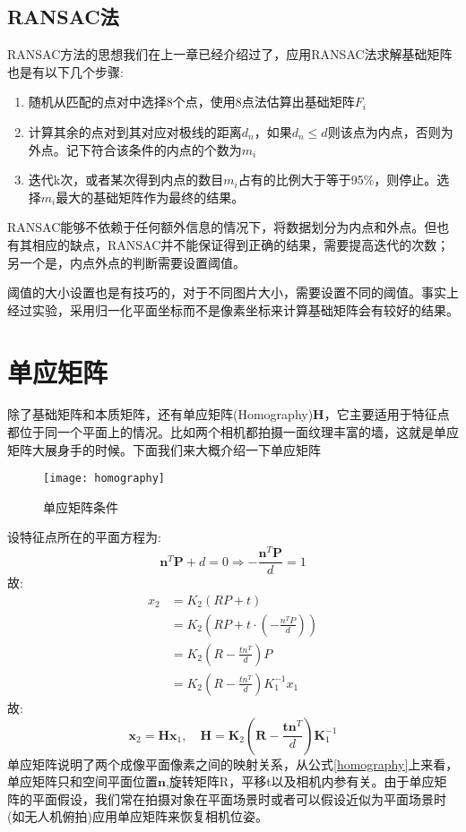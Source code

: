 \subsection{RANSAC法}
RANSAC方法的思想我们在上一章已经介绍过了，应用RANSAC法求解基础矩阵也是有以下几个步骤:
\begin{enumerate}
	\item 随机从匹配的点对中选择8个点，使用8点法估算出基础矩阵$F_i$
	\item 计算其余的点对到其对应对极线的距离$d_n$，如果$d_n≤d$则该点为内点，否则为外点。记下符合该条件的内点的个数为$m_i$
	\item 迭代k次，或者某次得到内点的数目$m_i$占有的比例大于等于95\%，则停止。选择$m_i$最大的基础矩阵作为最终的结果。
\end{enumerate}\par
RANSAC能够不依赖于任何额外信息的情况下，将数据划分为内点和外点。但也有其相应的缺点，RANSAC并不能保证得到正确的结果，需要提高迭代的次数；另一个是，内点外点的判断需要设置阈值。\par
阈值的大小设置也是有技巧的，对于不同图片大小，需要设置不同的阈值。事实上经过实验，采用归一化平面坐标而不是像素坐标来计算基础矩阵会有较好的结果。
\section{单应矩阵}
除了基础矩阵和本质矩阵，还有单应矩阵(Homography)$\boldsymbol{H}$，它主要适用于特征点都位于同一个平面上的情况。比如两个相机都拍摄一面纹理丰富的墙，这就是单应矩阵大展身手的时候。下面我们来大概介绍一下单应矩阵\par
\begin{figure}[H]
	\centering
	\texttt{[image: homography]}
	\caption{单应矩阵条件}
\end{figure}
设特征点所在的平面方程为:
\begin{equation}
	\boldsymbol{n}^{T} \boldsymbol{P}+d=0 \Rightarrow -\frac{\boldsymbol{n}^{T} \boldsymbol{P}}{d}=1
\end{equation}
故:
\begin{equation}
\begin{aligned} x_{2} &=K_{2}(R P+t) \\ &=K_{2}\left(R P+t \cdot\left(-\frac{n^{T} P}{d}\right)\right) \\ &=K_{2}\left(R-\frac{t n^{T}}{d}\right) P \\ &=K_{2}\left(R-\frac{t n^{T}}{d}\right) K_{1}^{-1} x_{1} \end{aligned}
\end{equation}
故:
\begin{equation}
\boldsymbol{x}_{2}=\boldsymbol{H x}_{1}, \quad \boldsymbol{H}=\boldsymbol{K}_{2}\left(\boldsymbol{R}-\frac{\boldsymbol{t} \boldsymbol{n}^{T}}{d}\right) \boldsymbol{K}_{1}^{-1}
\label{homography}
\end{equation}
单应矩阵说明了两个成像平面像素之间的映射关系，从公式\ref{homography}上来看，单应矩阵只和空间平面位置$\boldsymbol{n}$,旋转矩阵R，平移t以及相机内参有关。由于单应矩阵的平面假设，我们常在拍摄对象在平面场景时或者可以假设近似为平面场景时(如无人机俯拍)应用单应矩阵来恢复相机位姿。
